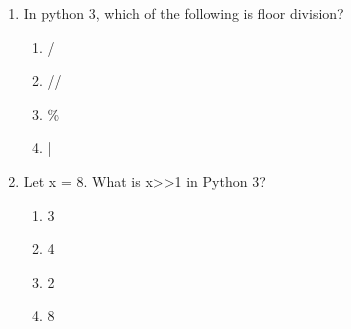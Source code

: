 \documentclass[12pt]{article}
\begin{document}
\begin{enumerate}[label=\arabic*.]
\begin{enumerate}[label=(\alph*)]
    \item 10000001, 10101010
\end{enumerate}
\item In python 3, which of the following is floor division?
\begin{enumerate}[label=(\alph*)]
    \item /
    \item //
    \item \%
    \item |
\end{enumerate}
\item Let x = 8. What is x>>1 in Python 3?
\begin{enumerate}[label=(\alph*)]
    \item 3
    \item 4
    \item 2
    \item 8
\end{enumerate}
\end{enumerate}
\end{document}
